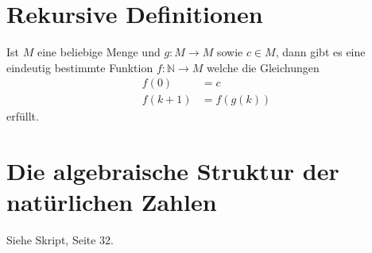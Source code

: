 \section{Rekursive Definitionen} %
\label{sec:rekursive_definitionen}
Ist \(M\) eine beliebige Menge und \(g: M \rightarrow M\) sowie \(c \in M\), dann gibt es eine eindeutig bestimmte Funktion \(f: \mathbb{N} \rightarrow M\) welche die Gleichungen
\begin{align*}
	f(0) &= c \\
	f(k+1) &= f(g(k))
\end{align*}
erfüllt.

\section{Die algebraische Struktur der natürlichen Zahlen} %
\label{sec:die_algebraische_struktur_der_natürlichen_zahlen}
Siehe Skript, Seite 32.
